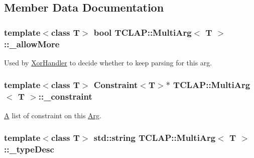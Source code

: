 \subsection{Member Data Documentation}
\hypertarget{class_t_c_l_a_p_1_1_multi_arg_a93a3ef586f763d46839c0e737689b85f}{
\subsubsection[{\+\_\+allow\+More}]{\setlength{\rightskip}{0pt plus 5cm}template$<$class T$>$ bool {\bf T\+C\+L\+A\+P\+::\+Multi\+Arg}$<$ T $>$\+::\+\_\+allow\+More\hspace{0.3cm}{\ttfamily [protected]}}}\label{class_t_c_l_a_p_1_1_multi_arg_a93a3ef586f763d46839c0e737689b85f}
Used by \hyperlink{class_t_c_l_a_p_1_1_xor_handler}{Xor\+Handler} to decide whether to keep parsing for this arg. \hypertarget{class_t_c_l_a_p_1_1_multi_arg_afc754048b66bc3a251268947273ea906}{
\subsubsection[{\+\_\+constraint}]{\setlength{\rightskip}{0pt plus 5cm}template$<$class T$>$ {\bf Constraint}$<$T$>$$\ast$ {\bf T\+C\+L\+A\+P\+::\+Multi\+Arg}$<$ T $>$\+::\+\_\+constraint\hspace{0.3cm}{\ttfamily [protected]}}}\label{class_t_c_l_a_p_1_1_multi_arg_afc754048b66bc3a251268947273ea906}
\hyperlink{class_a}{A} list of constraint on this \hyperlink{class_t_c_l_a_p_1_1_arg}{Arg}. \hypertarget{class_t_c_l_a_p_1_1_multi_arg_a0f6a2b04fe15d1ede95165fc6e1949e8}{
\subsubsection[{\+\_\+type\+Desc}]{\setlength{\rightskip}{0pt plus 5cm}template$<$class T$>$ std\+::string {\bf T\+C\+L\+A\+P\+::\+Multi\+Arg}$<$ T $>$\+::\+\_\+type\+Desc\hspace{0.3cm}{\ttfamily [protected]}}}\label{class_t_c_l_a_p_1_1_multi_arg_a0f6a2b04fe15d1ede95165fc6e1949e8}
